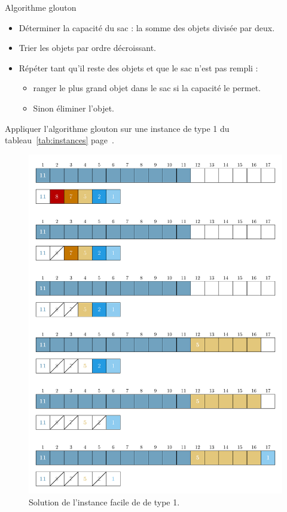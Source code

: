 \documentclass[11pt]{article}
\newcommand{\instance}[1]{instance de type #1 du tableau~\ref{tab:instances} page~\pageref{tab:instances}}
\begin{document}
  \begin{algorithme}{Algorithme glouton}
    \label{algo:gs}
    \begin{itemize}
    \item Déterminer la capacité du sac : la somme des objets divisée par deux.
    \item Trier les objets par ordre décroissant.
    \item  Répéter tant qu'il reste des objets et que le sac n'est pas rempli :
      \begin{itemize}
      \item ranger le plus grand objet dans le sac si la capacité le permet.
      \item Sinon éliminer l'objet.
      \end{itemize}
  \end{itemize}
  \end{algorithme}



  \begin{exercice}{}
    Appliquer l'algorithme glouton sur une \instance{1}.
  \end{exercice}

  \begin{figure}[htbp]
    \centering
    \includegraphics[width=0.6\linewidth]{ex1-6-GS.pdf}
    \caption{Solution de l'instance facile de de type 1.}
  \end{figure}
\end{document}
